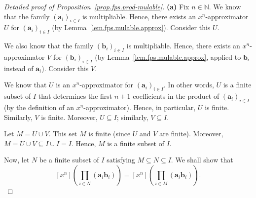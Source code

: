 \begin{proof}[Detailed proof of Proposition~\ref{prop.fps.prod-mulable}]
\leanok
\textbf{(a)} Fix $n \in \mathbb{N}$. We know that the family
$\left(\mathbf{a}_{i}\right)_{i \in I}$ is multipliable. Hence, there
exists an $x^n$-approximator $U$ for
$\left(\mathbf{a}_{i}\right)_{i \in I}$ (by
Lemma~\ref{lem.fps.mulable.approx}). Consider this $U$.

We also know that the family $\left(\mathbf{b}_{i}\right)_{i \in I}$ is
multipliable. Hence, there exists an $x^n$-approximator $V$ for
$\left(\mathbf{b}_{i}\right)_{i \in I}$ (by
Lemma~\ref{lem.fps.mulable.approx}, applied to $\mathbf{b}_{i}$ instead
of $\mathbf{a}_{i}$). Consider this $V$.

We know that $U$ is an $x^n$-approximator for
$\left(\mathbf{a}_{i}\right)_{i \in I}$. In other words, $U$ is a
finite subset of $I$ that determines the first $n+1$ coefficients in the
product of $\left(\mathbf{a}_{i}\right)_{i \in I}$ (by the definition
of an $x^n$-approximator). Hence, in particular, $U$ is finite.
Similarly, $V$ is finite. Moreover, $U \subseteq I$; similarly,
$V \subseteq I$.

Let $M = U \cup V$. This set $M$ is finite (since $U$ and $V$ are
finite). Moreover, $M = U \cup V \subseteq I \cup I = I$. Hence, $M$ is
a finite subset of $I$.

Now, let $N$ be a finite subset of $I$ satisfying
$M \subseteq N \subseteq I$. We shall show that
\[
\left[x^{n}\right] \left(\prod_{i \in N}
  \left(\mathbf{a}_{i} \mathbf{b}_{i}\right)\right)
= \left[x^{n}\right] \left(\prod_{i \in M}
  \left(\mathbf{a}_{i} \mathbf{b}_{i}\right)\right).
\]


\end{proof}
